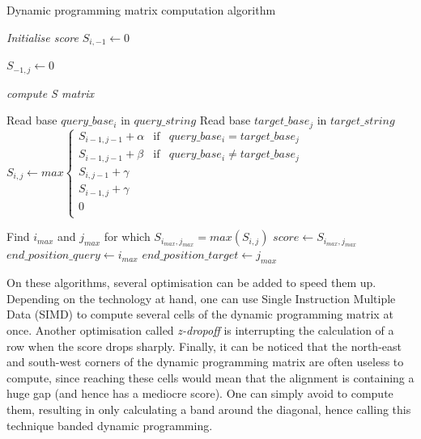 \begin{algorithm}[h!]
	\caption{Dynamic programming matrix computation algorithm}
	\label{algo:local}
	\begin{algorithmic}[1] %
		 \Comment{}
		

		\State \emph{Initialise score}
			\State $S_{i, -1} \leftarrow 0$
		\EndFor	
				
			\State $S_{-1, j} \leftarrow 0$	
		\EndFor
		
		\State \emph{compute S matrix}
			
				\State Read base $query\_base_i$ in $query\_string$
				\State Read base $target\_base_j$ in $target\_string$ 	
				\State $ 	S_{i,j} \leftarrow max \left\{
				\begin{array}{llll}
				S_{i-1, j-1} + \alpha & \mbox{if} & query\_base_i = target\_base_j \\
				S_{i-1, j-1} + \beta & \mbox{if} & query\_base_i \neq target\_base_j \\
				S_{i, j-1} + \gamma \\
				S_{i-1, j} + \gamma\\
				0 \\
				\end{array}
				\right. $
				
			\EndFor
			
		\EndFor
		
		\State Find $i_{max}$ and $j_{max}$ for which $S_{i_{max}, j_{max}} = max(S_{i,j})$
		\State $score \leftarrow S_{i_{max}, j_{max}}$
		\State $end\_position\_query \leftarrow i_{max}$
		\State $end\_position\_target \leftarrow j_{max}$
		
		\EndProcedure
		
	\end{algorithmic}
\end{algorithm}

On these algorithms, several optimisation can be added to speed them up. Depending on the technology at hand, one can use Single Instruction Multiple Data (SIMD) to compute several cells of the dynamic programming matrix at once. Another optimisation called \emph{z-dropoff} is interrupting the calculation of a row when the score drops sharply. Finally, it can be noticed that the north-east and south-west corners of the dynamic programming matrix are often useless to compute, since reaching these cells would mean that the alignment is containing a huge gap (and hence has a mediocre score). One can simply avoid to compute them, resulting in only calculating a band around the diagonal, hence calling this technique banded dynamic programming.
